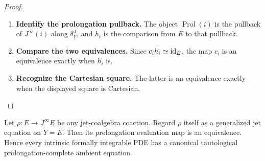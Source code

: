 \begin{proof}
\leavevmode
\begin{enumerate}[label=\textup{(\arabic*)}]
    \item \textbf{Identify the prolongation pullback.}
The object \(\operatorname{Prol}(i)\) is the pullback of \(J^\infty(i)\) along
\(\delta^J_Y\), and \(h_i\) is the comparison from \(E\) to that pullback.

    \item \textbf{Compare the two equivalences.}
Since
\(c_ih_i\simeq\operatorname{id}_E\), the map \(c_i\) is an equivalence exactly when
\(h_i\) is.

    \item \textbf{Recognize the Cartesian square.}
The latter is an equivalence exactly when the displayed square is
Cartesian.
\end{enumerate}
\end{proof}

\begin{theorem}
\label{thm:tautological-prolongation-completeness}
Let \(\rho:E\to J^\infty E\) be any jet-coalgebra coaction. Regard \(\rho\)
itself as a generalized jet equation on \(Y=E\). Then its prolongation evaluation map is an
equivalence. Hence every intrinsic formally integrable PDE has a canonical
tautological prolongation-complete ambient equation.
\end{theorem}

